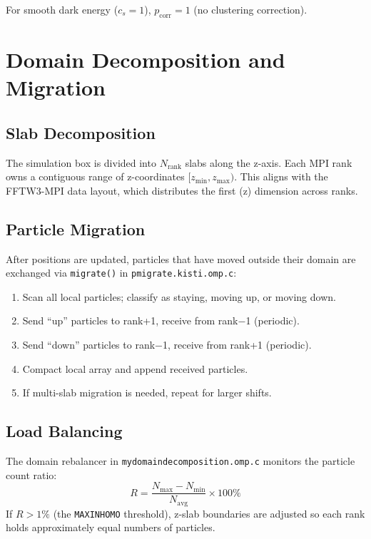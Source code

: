 \documentclass[11pt,fleqn]{book}
\newcommand{\code}[1]{\texttt{#1}}
\newcommand{\file}[1]{\texttt{#1}}
\begin{document}
For smooth dark energy ($c_s = 1$), $p_\text{corr} = 1$ (no clustering correction).


\chapter{Domain Decomposition and Migration}
\label{ch:domain}

\section{Slab Decomposition}

The simulation box is divided into $N_\text{rank}$ slabs along the z-axis.  Each MPI rank owns a contiguous range of z-coordinates $[z_\text{min}, z_\text{max})$.  This aligns with the FFTW3-MPI data layout, which distributes the first (z) dimension across ranks.

\section{Particle Migration}

After positions are updated, particles that have moved outside their domain are exchanged via \code{migrate()} in \file{pmigrate.kisti.omp.c}:

\begin{algorithm}
\begin{enumerate}[leftmargin=2em]
  \item Scan all local particles; classify as staying, moving up, or moving down.
  \item Send ``up'' particles to rank+1, receive from rank$-$1 (periodic).
  \item Send ``down'' particles to rank$-$1, receive from rank+1 (periodic).
  \item Compact local array and append received particles.
  \item If multi-slab migration is needed, repeat for larger shifts.
\end{enumerate}
\end{algorithm}

\section{Load Balancing}

The domain rebalancer in \file{mydomaindecomposition.omp.c} monitors the particle count ratio:
\begin{equation}
  R = \frac{N_\text{max} - N_\text{min}}{N_\text{avg}} \times 100\%
\end{equation}
If $R > 1\%$ (the \code{MAXINHOMO} threshold), z-slab boundaries are adjusted so each rank holds approximately equal numbers of particles.
\end{document}

